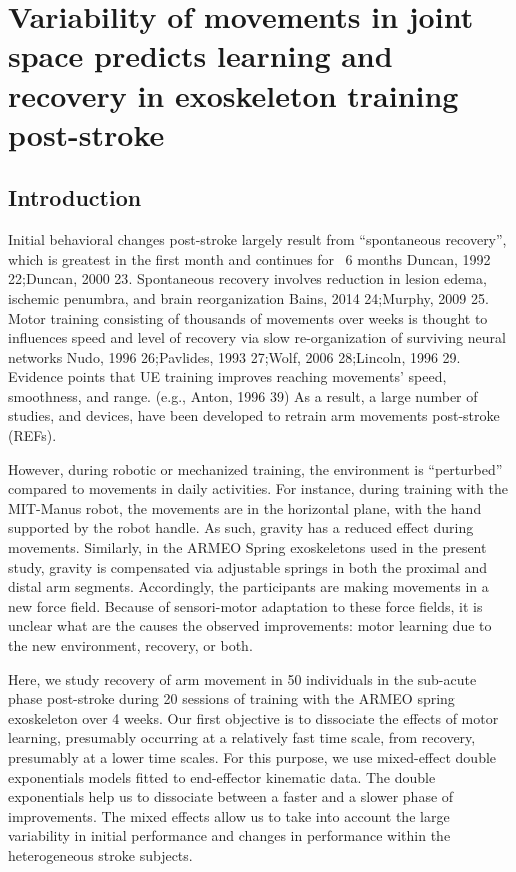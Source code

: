 \chapter{Variability of movements in joint space predicts learning and recovery	in exoskeleton training post-stroke}
\label{cha:armeospring}


\section{Introduction}

Initial behavioral changes post-stroke largely result from “spontaneous recovery”, which is greatest in the first month and continues for ~6 months {Duncan, 1992 22;Duncan, 2000 23}. 
Spontaneous recovery involves reduction in lesion edema, ischemic penumbra, and brain reorganization {Bains, 2014 24;Murphy, 2009 25}. 
Motor training consisting of thousands of movements over weeks is thought to influences speed and level of recovery via slow re-organization of surviving neural networks {Nudo, 1996 26;Pavlides, 1993 27;Wolf, 2006 28;Lincoln, 1996 29}. 
Evidence points that UE training improves reaching movements’ speed, smoothness, and range. (e.g., {Anton, 1996 39}) 
As a result, a large number of studies, and devices, have been developed to retrain arm movements post-stroke (REFs). 

However, during robotic or mechanized training, the environment is “perturbed” compared to movements in daily activities. 
For instance, during training with the MIT-Manus robot, the movements are in the horizontal plane, with the hand supported by the robot handle. 
As such, gravity has a reduced effect during movements. 
Similarly, in the ARMEO Spring exoskeletons used in the present study, gravity is compensated via adjustable springs in both the proximal and distal arm segments.
Accordingly, the participants are making movements in a new force field. 
Because of sensori-motor adaptation to these force fields, it is unclear what are the causes the observed improvements: motor learning due to the new environment, recovery, or both. 

Here, we study recovery of arm movement in 50 individuals in the sub-acute phase post-stroke during 20 sessions of training with the ARMEO spring exoskeleton over 4 weeks.
Our first objective is to dissociate the effects of motor learning, presumably occurring at a relatively fast time scale, from recovery, presumably at a lower time scales.  
For this purpose, we use mixed-effect double exponentials models fitted to end-effector kinematic data. 
The double exponentials help us to dissociate between a faster and a slower phase of improvements. 
The mixed effects allow us to take into account the large variability in initial performance and changes in performance within the heterogeneous stroke subjects.

